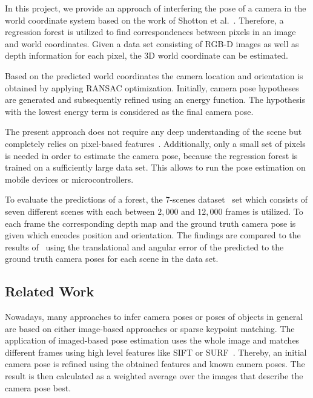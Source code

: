 \documentclass[final]{cvpr}
\begin{document}
In this project, we provide an approach of interfering the pose of a camera in the world coordinate system
based on the work of Shotton et al.~\cite{shotton2013}. Therefore, a regression forest is utilized to find correspondences
between pixels in an image and world coordinates. Given a data set
consisting of RGB-D images as well as depth information for each pixel, the 3D world coordinate can be estimated.

Based on the predicted world coordinates the camera location and orientation is obtained by applying RANSAC
optimization. Initially, camera pose hypotheses are generated and subsequently refined using an energy function.
The hypothesis with the lowest energy term is considered as the final camera pose. 

The present approach does not require any deep understanding of the scene but completely relies on 
pixel-based features~\cite{shotton2013}. Additionally, only a small set of pixels is needed in order to estimate 
the camera pose, because the regression forest is trained on a sufficiently large data set. This allows to 
run the pose estimation on mobile devices or microcontrollers.

To evaluate the predictions of a forest, the 7-scenes dataset~\cite{glocker2013} set which consists of seven 
different scenes with each between $2,000$ and $12,000$ frames is utilized. To each frame the corresponding 
depth map and the ground truth camera pose is given which encodes position and orientation. The findings are 
compared to the results of~\cite{shotton2013} using the translational and angular error of 
the predicted to the ground truth camera poses for each scene in the data set.


\subsection{Related Work}
Nowadays, many approaches to infer camera poses or poses of objects in general are based on either image-based approaches or 
sparse keypoint matching. The application of imaged-based pose estimation uses the whole image and matches different frames 
using high level features like \ac{SIFT} or \ac{SURF}~\cite{Klein2008}. Thereby, an initial camera pose is refined using 
the obtained features and known camera poses. The result is then calculated as a weighted average over the 
images that describe the camera pose best. 
\end{document}
